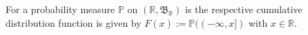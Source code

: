 \begin{definition}
    
\end{definition}

\begin{definition}
    For a probability measure \(\mathbb{P}\) on \((\mathbb{R}, \mathfrak{B}_\mathbb{R})\) is the respective cumulative distribution function is given by \(F(x) := \mathbb{P}((-\infty, x])\) with \(x \in \mathbb{R}\).
\end{definition}

\begin{lemma}
    
\end{lemma}